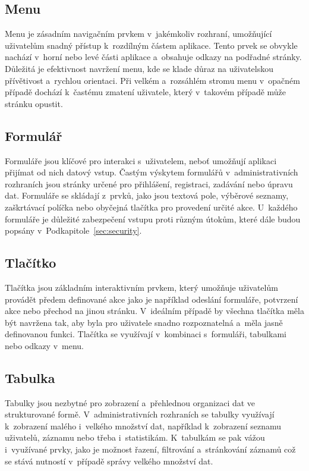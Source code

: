 \subsection*{Menu}
\label{subsec:admin-tags-menu}
Menu je zásadním navigačním prvkem v~jakémkoliv rozhraní, umožňující uživatelům snadný přístup k~rozdílným částem aplikace. Tento prvek se obvykle nachází v~horní nebo levé části aplikace a~obsahuje odkazy na podřadné stránky. Důležitá je efektivnost navržení menu, kde se klade důraz na uživatelskou přívětivost a~rychlou orientaci. Při velkém a~rozsáhlém stromu menu v~opačném případě dochází k~častému zmatení uživatele, který v~takovém případě může stránku opustit.

\subsection*{Formulář}
\label{subsec:admin-tags-form}
Formuláře jsou klíčové pro interakci s~uživatelem, neboť umožňují aplikaci přijímat od nich datový vstup. Častým výskytem formulářů v~administrativních rozhraních jsou stránky určené pro přihlášení, registraci, zadávání nebo úpravu dat. Formuláře se skládají z~prvků, jako jsou textová pole, výběrové seznamy, zaškrtávací políčka nebo obyčejná tlačítka pro provedení určité akce. U~každého formuláře je důležité zabezpečení vstupu proti různým útokům, které dále budou popsány v~Podkapitole~\ref{sec:security}.

\subsection*{Tlačítko}
\label{subsec:admin-tags-button}
Tlačítka jsou základním interaktivním prvkem, který umožňuje uživatelům provádět předem definované akce jako je například odeslání formuláře, potvrzení akce nebo přechod na jinou stránku. V~ideálním případě by všechna tlačítka měla být navržena tak, aby byla pro uživatele snadno rozpoznatelná a~měla jasně definovanou funkci. Tlačítka se využívají v~kombinaci s~formuláři, tabulkami nebo odkazy v~menu.

\subsection*{Tabulka}
\label{subsec:admin-tags-table}
Tabulky jsou nezbytné pro zobrazení a~přehlednou organizaci dat ve strukturované formě. V~administrativních rozhraních se tabulky využívají k~zobrazení malého i~velkého množství dat, například k~zobrazení seznamu uživatelů, záznamu nebo třeba i~statistikám. K~tabulkám se pak vážou i~využívané prvky, jako je možnost řazení, filtrování a~stránkování záznamů což se stává nutností v~případě správy velkého množství dat.

